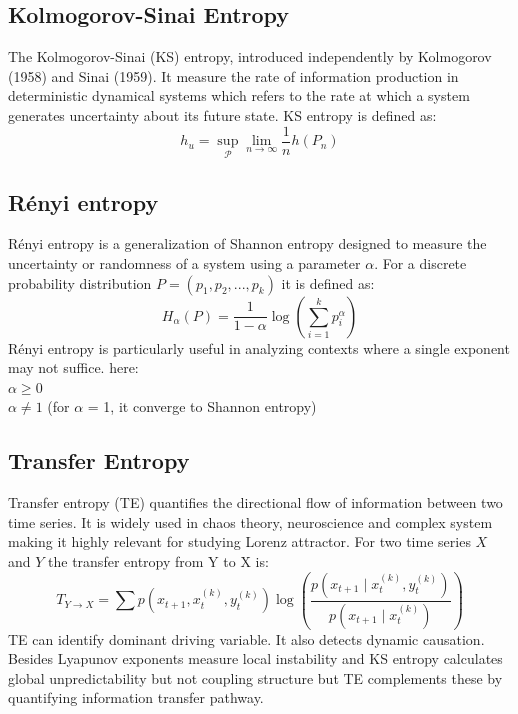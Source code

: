 \documentclass[%
reprint,
amsmath,amssymb,
aps,
floatfix,
]{revtex4-2}
\begin{document}
	\subsection{Kolmogorov-Sinai Entropy}
	The Kolmogorov-Sinai (KS) entropy, introduced independently by Kolmogorov\cite{kolmogorov1958new} (1958) and Sinai\cite{sinai1959notion} (1959). It measure the rate of information production in deterministic dynamical systems which refers to the rate at which a system generates uncertainty about its future state. KS entropy is defined as:
	\begin{equation}
		h_u  = \operatorname*{sup}_{\mathcal{P}} \operatorname*{\lim}_{n \to \infty} \frac{1}{n} h(P_n)	
	\end{equation}
	\subsection{Rényi entropy}
	Rényi entropy\cite{renyi1961measures}  is a generalization of Shannon entropy designed to measure the uncertainty or randomness of a system using a parameter $\alpha$. For a discrete probability distribution $P = (p_1,p_2,...,p_k)$ it is defined as:
	\begin{equation}
		H_\alpha (P) = \frac{1}{1 - \alpha} \log (\sum_{i=1}^{k} p_{i}^{\alpha})
	\end{equation}
	R\'enyi entropy is particularly useful in analyzing contexts where a single exponent may not suffice. 
	here:\\
	$\alpha \geq 0$\\ 
	$\alpha \neq 1$ (for $\alpha$ = 1, it converge to Shannon entropy)\\
	\subsection{Transfer Entropy}
	Transfer entropy (TE) quantifies the directional flow of information between two time series. It is widely used in chaos theory, neuroscience and complex system making it highly relevant for studying Lorenz attractor. For two time series $X$ and $Y$ the transfer entropy from Y to X is:
	\begin{equation}
		T_{Y\to X} = \sum p(x_{t+1}, x_{t}^{(k)}, y_{t}^{(k)}) \log\left( \frac{p(x_{t+1} \mid x_{t}^{(k)}, y_{t}^{(k)})}{p(x_{t+1} \mid x_{t}^{(k)})} \right)
	\end{equation}
	TE can identify dominant driving variable. It also detects dynamic causation. Besides Lyapunov exponents measure local instability and KS entropy calculates global unpredictability but not coupling structure but TE complements these by quantifying information transfer pathway.
\end{document}
